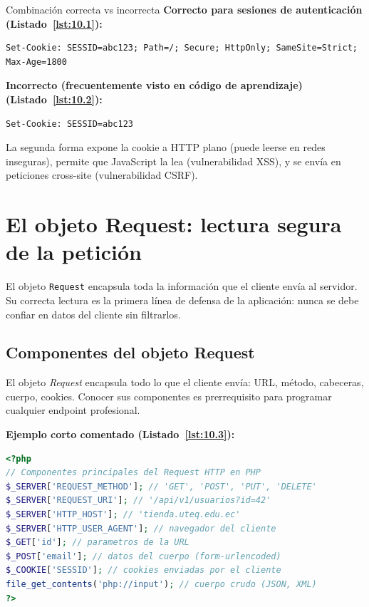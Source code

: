 \begin{cajaadvertencia}{Combinación correcta vs incorrecta}
\textbf{Correcto para sesiones de autenticación (Listado~\ref{lst:10.1}):}
\begin{lstlisting}[style=shell,numbers=none,caption={Ejemplo de Shell},label=lst:10.1]
Set-Cookie: SESSID=abc123; Path=/; Secure; HttpOnly; SameSite=Strict; Max-Age=1800
\end{lstlisting}
\textbf{Incorrecto (frecuentemente visto en código de aprendizaje) (Listado~\ref{lst:10.2}):}
\begin{lstlisting}[style=shell,numbers=none,caption={Ejemplo de Shell},label=lst:10.2]
Set-Cookie: SESSID=abc123
\end{lstlisting}
La segunda forma expone la cookie a HTTP plano (puede leerse en redes
inseguras), permite que JavaScript la lea (vulnerabilidad XSS), y se
envía en peticiones cross-site (vulnerabilidad CSRF).
\end{cajaadvertencia}

\section{El objeto Request: lectura segura de la petición}

El objeto \texttt{Request} encapsula toda la información que el
cliente envía al servidor. Su correcta lectura es la primera línea de
defensa de la aplicación: nunca se debe confiar en datos del cliente
sin filtrarlos.

\subsection{Componentes del objeto Request}

El objeto \emph{Request} encapsula todo lo que el cliente
envía: URL, método, cabeceras, cuerpo, cookies. Conocer sus
componentes es prerrequisito para programar cualquier endpoint
profesional.

\textbf{Ejemplo corto comentado (Listado~\ref{lst:10.3}):}
\begin{lstlisting}[language=PHP,numbers=none,caption={Ejemplo de PHP},label=lst:10.3]
<?php
// Componentes principales del Request HTTP en PHP
$_SERVER['REQUEST_METHOD']; // 'GET', 'POST', 'PUT', 'DELETE'
$_SERVER['REQUEST_URI']; // '/api/v1/usuarios?id=42'
$_SERVER['HTTP_HOST']; // 'tienda.uteq.edu.ec'
$_SERVER['HTTP_USER_AGENT']; // navegador del cliente
$_GET['id']; // parametros de la URL
$_POST['email']; // datos del cuerpo (form-urlencoded)
$_COOKIE['SESSID']; // cookies enviadas por el cliente
file_get_contents('php://input'); // cuerpo crudo (JSON, XML)
?>
\end{lstlisting}


